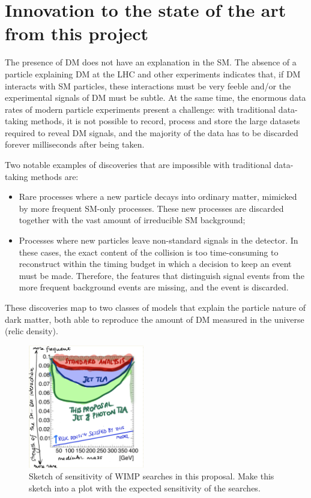 \documentclass[11pt,a4paper]{article}
\begin{document}
\section{Innovation to the state of the art from this project} 
\smallskip

The presence of DM does not have an explanation in the SM. 
The absence of a particle explaining DM at the LHC and other experiments indicates that, if DM interacts with SM particles, these interactions must be very feeble and/or the experimental signals of DM must be subtle. 
At the same time, the enormous data rates of modern particle experiments present a challenge: with traditional data-taking methods, it is not possible to record, process and store the large datasets required to reveal DM signals, and the majority of the data has to be discarded forever milliseconds after being taken. 
  
Two notable examples of discoveries that are impossible with traditional data-taking methods are:
\begin{itemize} 
\item Rare processes where a new particle decays into ordinary matter, mimicked by more frequent SM-only processes.
These new processes are discarded together with the vast amount of irreducible SM background;
\item Processes where new particles leave non-standard signals in the detector. 
In these cases, the exact content of the collision is too time-consuming to reconstruct within the timing budget in which a decision to keep an event must be made. Therefore, the features that distinguish signal events from the more frequent background events are missing, and the event is discarded.
\end{itemize}

These discoveries map to two classes of models that explain the particle nature of dark matter, both able to reproduce the amount of DM measured in the universe (relic density). 

\begin{figure} 
\begin{center}
\includegraphics[width=0.45\textwidth]{figs/SensitivityWIMP.png}
\caption{Sketch of sensitivity of WIMP searches in this proposal. \scriptsize \color{red} Make this sketch into a plot with the expected sensitivity of the searches. \color{black}\label{fig:pastFutureConstraints} }
\end{center}
\end{figure}
\end{document}
